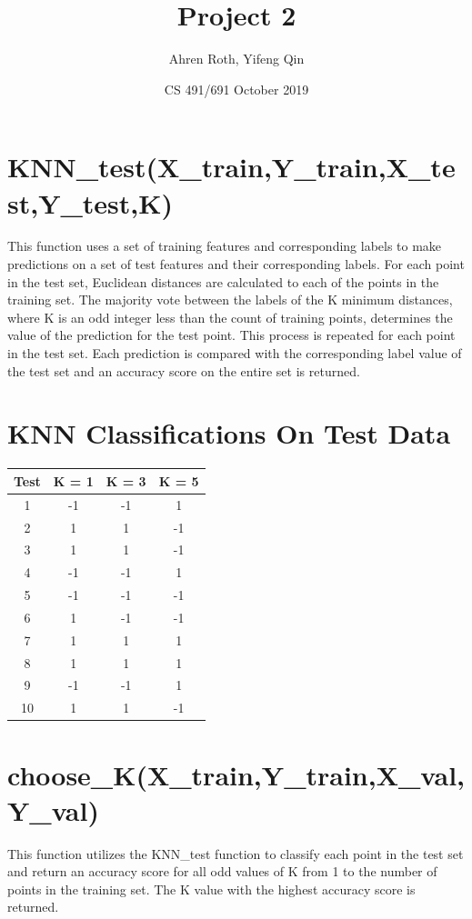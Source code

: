 \documentclass{article}
\title{Project 2}
\author{Ahren Roth, Yifeng Qin }
\date{CS 491/691 October 2019}
\begin{document}
\maketitle

\section{KNN\_test(X\_train,Y\_train,X\_test,Y\_test,K)}
This function uses a set of training features and corresponding labels to make predictions on a set of test features and their corresponding labels. For each point in the test set, Euclidean distances are calculated to each of the points in the training set. The majority vote between the labels of the K minimum distances, where K is an odd integer less than the count of training points, determines the value of the prediction for the test point. This process is repeated for each point in the test set. Each prediction is compared with the corresponding label value of the test set and an accuracy score on the entire set is returned.

\section{KNN Classifications On Test Data}
\begin{tabular}{c | c | c | c}
\hline
     Test & K = 1 & K = 3 & K = 5 \\ \hline
     1 & -1 & -1 & 1\\
     2 & 1 & 1 & -1\\
     3 & 1 & 1 & -1\\
     4 & -1 & -1 & 1\\
     5 & -1 & -1 & -1\\
     6 & 1 & -1 & -1\\
     7 & 1 & 1 & 1\\
     8 & 1 & 1 & 1\\
     9 & -1 & -1 & 1\\
     10 & 1 & 1 & -1

\end{tabular}

\section{choose\_K(X\_train,Y\_train,X\_val,Y\_val)}
This function utilizes the KNN\_test function to classify each point in the test set and return an accuracy score for all odd values of K from 1 to the number of points in the training set. The K value with the highest accuracy score is returned.
\end{document}
